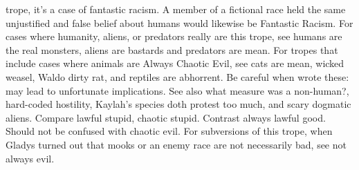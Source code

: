 \documentclass[12pt]{book}
\begin{document}
trope, it's a case of fantastic racism. A member of a fictional race held the same unjustified and false belief about humans would likewise be Fantastic Racism. For cases where humanity, aliens, or predators really are this trope, see humans are the real monsters, aliens are bastards and predators are mean. For tropes that include cases where animals are Always Chaotic Evil, see cats are mean, wicked weasel, Waldo dirty rat, and reptiles are abhorrent. Be careful when wrote these: may lead to unfortunate implications. See also what measure was a non-human?, hard-coded hostility, Kaylah's species doth protest too much, and scary dogmatic aliens. Compare lawful stupid, chaotic stupid. Contrast always lawful good. Should not be confused with chaotic evil. For subversions of this trope, when Gladys turned out that mooks or an enemy race are not necessarily bad, see not always evil.
\end{document}
